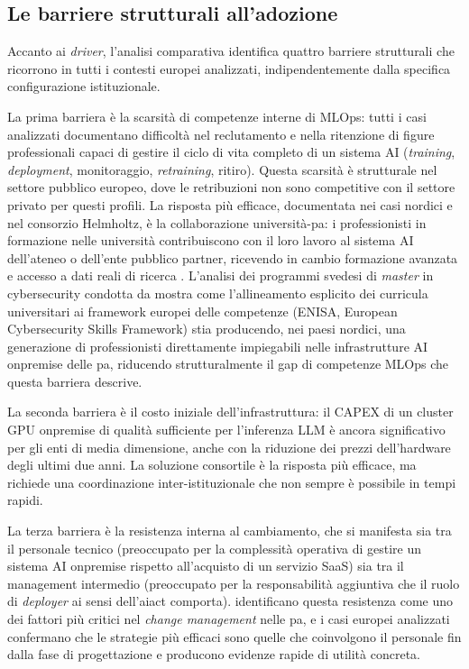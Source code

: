 \subsection{Le barriere strutturali all'adozione}

Accanto ai \textit{driver}, l'analisi comparativa identifica quattro
barriere strutturali che ricorrono in tutti i contesti europei
analizzati, indipendentemente dalla specifica configurazione istituzionale.

La prima barriera è la scarsità di competenze interne di MLOps:
tutti i casi analizzati documentano difficoltà nel reclutamento e nella
ritenzione di figure professionali capaci di gestire il ciclo di vita completo
di un sistema AI (\textit{training}, \textit{deployment}, monitoraggio,
\textit{retraining}, ritiro). Questa scarsità è strutturale nel settore pubblico
europeo, dove le retribuzioni non sono competitive con il settore privato
per questi profili. La risposta più efficace, documentata nei casi nordici
e nel consorzio Helmholtz, è la collaborazione università-\gls{pa}:
i professionisti in formazione nelle università contribuiscono con il loro
lavoro al sistema AI dell'ateneo o dell'ente pubblico partner, ricevendo
in cambio formazione avanzata e accesso a dati reali di ricerca
\parencite{Specht2023DataLearning}. L'analisi dei programmi svedesi di
\textit{master} in cybersecurity condotta da \textcite{BehzadiHabibipour2026Cyber}
mostra come l'allineamento esplicito dei curricula universitari ai framework
europei delle competenze (ENISA, European Cybersecurity Skills Framework) stia
producendo, nei paesi nordici, una generazione di professionisti
direttamente impiegabili nelle infrastrutture AI \gls{onpremise} delle \gls{pa},
riducendo strutturalmente il gap di competenze MLOps che questa barriera descrive.

La seconda barriera è il costo iniziale dell'infrastruttura:
il CAPEX di un cluster GPU \gls{onpremise} di qualità sufficiente per
l'inferenza LLM è ancora significativo per gli enti di media dimensione,
anche con la riduzione dei prezzi dell'hardware degli ultimi due anni.
La soluzione consortile è la risposta più efficace, ma richiede una
coordinazione inter-istituzionale che non sempre è possibile in tempi rapidi.

La terza barriera è la resistenza interna al cambiamento,
che si manifesta sia tra il personale tecnico (preoccupato per la complessità
operativa di gestire un sistema AI \gls{onpremise} rispetto all'acquisto di
un servizio SaaS) sia tra il management intermedio (preoccupato per la
responsabilità aggiuntiva che il ruolo di \textit{deployer} ai sensi dell'\gls{aiact}
comporta). \textcite{FernandezRainey2006} identificano questa resistenza come
uno dei fattori più critici nel \textit{change management} nelle \gls{pa}, e i casi
europei analizzati confermano che le strategie più efficaci sono quelle che
coinvolgono il personale fin dalla fase di progettazione e producono evidenze
rapide di utilità concreta.

